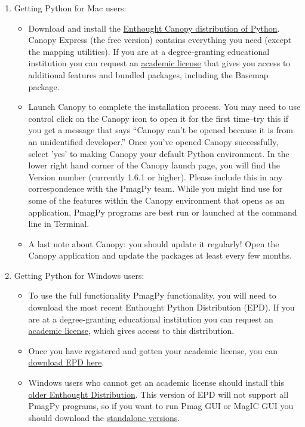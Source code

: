 \documentclass[11pt]{book}
\begin{document}
{\begin{enumerate}
 \item Getting Python for Mac users:
   \begin{itemize}
   \item Download and install the \href{https://www.enthought.com/products/canopy/}{Enthought Canopy distribution of Python}. Canopy Express (the free version) contains everything you need (except the mapping utilities). If you are at a degree-granting educational institution you can request an \href{https://www.enthought.com/products/canopy/academic/}{academic license} that gives you access to additional features and bundled packages, including the Basemap package.
   \item Launch Canopy to complete the installation process.  You may need to use control click on the Canopy icon to open it for the first time--try this if you get a message that says ``Canopy can't be opened because it is from an unidentified developer.''  Once you've opened Canopy successfully, select 'yes' to making Canopy your default Python environment.  In the lower right hand corner of the Canopy launch page, you will find the Version number (currently 1.6.1 or higher). Please include this in any correspondence with the PmagPy team. While you might find use for some of the features within the Canopy environment that opens as an application, PmagPy programs are best run or launched at the command line in Terminal.
   \item A last note about Canopy: you should update it regularly!  Open the Canopy application and update the packages at least every few months.
   \end{itemize}
 \item Getting Python for Windows users:
   \begin{itemize}
   \item To use the full functionality PmagPy functionality, you will need to download the most recent Enthought Python Distribution (EPD).  If you are at a degree-granting educational institution you can request an \href{https://www.enthought.com/products/canopy/academic/}{academic license}, which gives access to this distribution.
   \item Once you have registered and gotten your academic license, you can \href{https://store.enthought.com/repo/epd/installers/epd-7.5-2-win-x86_64.msi}{download EPD here}.
   \item Windows users who cannot get an academic license should install this \href{http://magician.ucsd.edu/Software/PmagPy/archive/epd-7.3-2-win-x86.msi}{older Enthought Distribution}.  This version of EPD will not support all PmagPy programs, so if you want to run Pmag GUI or MagIC GUI you should download the \href{#standalone}{standalone versions}.

\end{itemize}
\end{enumerate}}
\end{document}
